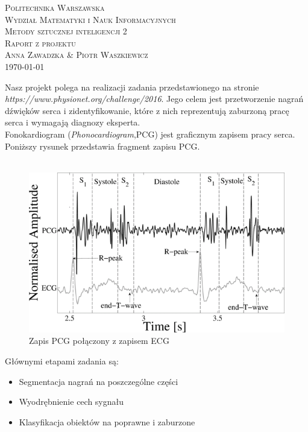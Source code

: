 \documentclass[a4paper]{report}
\begin{document}
\begin{center}

\textsc{\large Politechnika Warszawska}\\[0.1cm]
\textsc{\large Wydział Matematyki i Nauk Informacyjnych}\\[0.7cm]
\textsc{\Large Metody sztucznej inteligencji 2}\\[0.1cm]
\textsc{\large Raport z projektu}\\[0.5cm]
\textsc{\large Anna Zawadzka \& Piotr Waszkiewicz}\\[0.2cm]
{\large \today}\\[1cm]
\end{center}

Nasz projekt polega na realizacji zadania przedstawionego na stronie\\
\textit{https://www.physionet.org/challenge/2016}. Jego celem jest przetworzenie nagrań dźwięków serca i zidentyfikowanie, które z nich reprezentują zaburzoną pracę serca i wymagają diagnozy eksperta.\\
Fonokardiogram (\textit{Phonocardiogram},PCG) jest graficznym zapisem pracy serca. Poniższy rysunek przedstawia fragment zapisu PCG.\\\\

\begin{figure}[!htp]
    \centering
    \includegraphics[scale=0.5]{figure1}
    \caption{Zapis PCG połączony z zapisem ECG}
    \label{figure1}
\end{figure}

Głównymi etapami zadania są:
\begin{itemize}
    \item Segmentacja nagrań na poszczególne części
    \item Wyodrębnienie cech sygnału
    \item Klasyfikacja obiektów na poprawne i zaburzone
\end{itemize}
\end{document}
